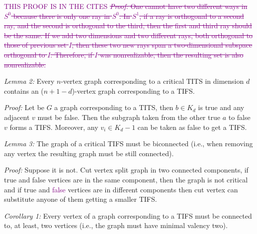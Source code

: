 \documentclass[%
  twocolumn,
 showpacs,
 showkeys,
 preprintnumbers,
 amsmath,amssymb,
 aps,
  pra,
  longbibliography,
 floatfix,
 ]{revtex4-1}
\newcommand{\jr}[1]{\textcolor{purple}{#1}}
\def\endproof{ }
\begin{document}

\jr{THIS PROOF IS IN THE CITES  \sout{
{\em Proof:} One cannot have two different ways in $S^0$ because there is only one ray in $S^0$. In $S^1$, if a ray is orthogonal to a second ray, and the second is orthogonal to the third, then the first and third ray should be the same. If we add two dimensions and two different rays, both orthogonal to those of previous set $I$, then these two new rays span a two-dimensional subspace orthogonal to $I$. Therefore, if $I$ was nonrealizable, then the resulting set is also nonrealizable.\endproof} }


{\em Lemma 2:} Every $n$-vertex graph corresponding to a critical TITS in dimension $d$ contains an ($n+1-d$)-vertex graph corresponding to a TIFS.


{\em Proof:} Let be $G$ a graph corresponding to a TITS, then $b \in K_d$ is true and any adjacent $v$ must be false. Then the subgraph taken from the other true $a$ to false $v$ forms a TIFS. Moreover, any $v_i \in K_d-1$ can be taken as false to get a TIFS. \endproof


{\em Lemma 3:} The graph of a critical TIFS must be biconnected (i.e., when removing any vertex the resulting graph must be still connected).


{\em Proof:} Suppose it is not. Cut vertex split graph in two connected components, if true and false vertices are in the same component, then the graph is not critical and if true and \jr{false} vertices are in different components then cut vertex can substitute anyone of them getting a smaller TIFS. \endproof



{\em Corollary 1:} Every vertex of a graph corresponding to a TIFS must be connected to, at least, two vertices (i.e., the graph must have minimal valency two).
\end{document}

